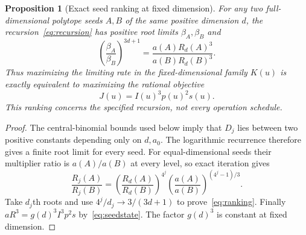 \documentclass[11pt]{article}
\newtheorem{proposition}[theorem]{Proposition}
\begin{document}
\begin{proposition}[Exact seed ranking at fixed dimension]\label{prop:ranking}
For any two full-dimensional polytope seeds $A,B$ of the same positive dimension $d$,
the recursion~\eqref{eq:recursion} has positive root limits
$\beta_A,\beta_B$ and
\begin{equation}\label{eq:ranking}
 \left(\frac{\beta_A}{\beta_B}\right)^{3d+1}
 =\frac{a(A)R_d(A)^3}{a(B)R_d(B)^3}.
\end{equation}
Thus maximizing the limiting rate in the fixed-dimensional family
$K(u)$ is exactly equivalent to maximizing the rational objective
\[
 J(u)=I(u)^3p(u)^2s(u).
\]
This ranking concerns the specified recursion, not every operation schedule.
\end{proposition}
\begin{proof}
The central-binomial bounds used below imply that $D_j$ lies between
two positive constants depending only on $d,a_0$. The logarithmic
recurrence therefore gives a finite root limit for every seed.
For equal-dimensional seeds their multiplier ratio is $a(A)/a(B)$
at every level, so exact iteration gives
\[
 \frac{R_j(A)}{R_j(B)}
 =\left(\frac{R_d(A)}{R_d(B)}\right)^{4^j}
  \left(\frac{a(A)}{a(B)}\right)^{(4^j-1)/3}.
\]
Take $d_j$th roots and use $4^j/d_j\to3/(3d+1)$ to prove~\eqref{eq:ranking}.
Finally $aR^3=g(d)^3I^3p^2s$ by~\eqref{eq:seedstate}.
The factor $g(d)^3$ is constant at fixed dimension.
\end{proof}
\end{document}
